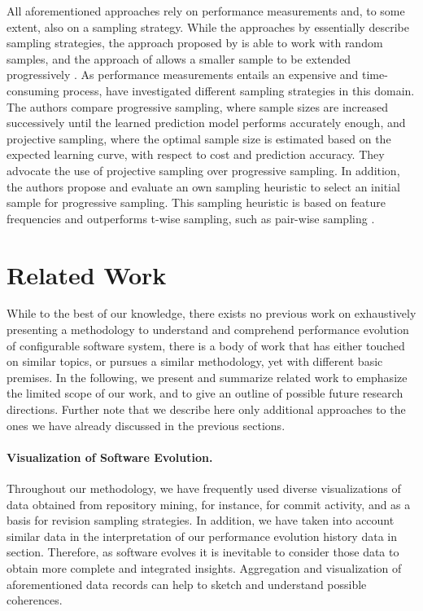 All aforementioned approaches rely on performance measurements and, to
some extent, also on a  sampling strategy. While the approaches by
\cite{siegmund_predicting_2012,siegmund_performance-influence_2015} essentially describe sampling strategies,
the approach proposed by \cite{zhang_performance_2015} is able to work with random samples, and the
approach of \cite{guo_variability-aware_2013} allows a smaller sample to be
extended progressively \citep{guo_variability-aware_2013}.
As performance measurements entails an expensive and time-consuming process,
\cite{sarkar_cost-efficient_2015} have investigated different sampling
strategies in this domain.
The authors compare progressive sampling, where sample sizes are increased
successively until the learned prediction model performs accurately enough, and projective
sampling, where the optimal sample size is estimated based on the expected
learning curve, with respect to cost and prediction accuracy. They advocate the
use of projective sampling over progressive sampling. In addition, the authors
propose and evaluate an own sampling heuristic to select an initial sample for
progressive sampling. This sampling heuristic is based on feature frequencies
and outperforms t-wise sampling, such as pair-wise sampling
\citep{sarkar_cost-efficient_2015}.

\section{Related Work}\label{sec:relatedwork}
While to the best of our knowledge, there exists no previous work on
exhaustively presenting a methodology to understand and comprehend performance
evolution of configurable software system, there is a body of work that has
either touched on similar topics, or pursues a similar methodology, yet with
different basic premises. In the following, we present and summarize related
work to emphasize the limited scope of our work, and to give an outline of
possible future research directions. Further note that we describe here only
additional approaches to the ones we have already discussed in the previous
sections.

\paragraph{Visualization of Software Evolution.}
Throughout our methodology, we have frequently used diverse visualizations of
data obtained from repository mining, for instance, for commit activity, and as
a basis for revision sampling strategies. In addition, we have taken into
account similar data in the interpretation of our performance evolution history
data in section. Therefore, as software evolves it is inevitable to
consider those data to obtain more complete and integrated insights.
Aggregation and visualization of aforementioned data records can help to sketch
and understand possible coherences.

